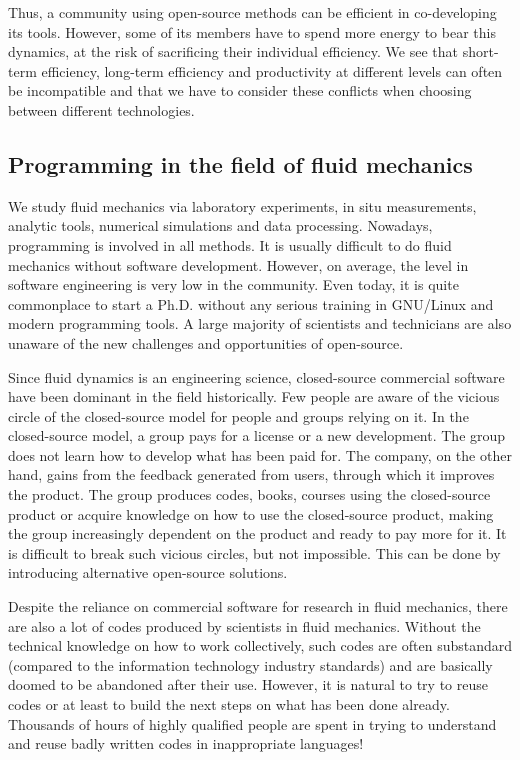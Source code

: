 Thus, a community using open-source methods can be efficient in co-developing
its tools. However, some of its members have to spend more energy to bear this
dynamics, at the risk of sacrificing their individual efficiency.  We see that
short-term efficiency, long-term efficiency and productivity at different
levels can often be incompatible and that we have to consider these conflicts
when choosing between different technologies.

\subsection{Programming in the field of fluid mechanics}

We study fluid mechanics via laboratory experiments, in situ measurements,
analytic tools, numerical simulations and data processing.
%
Nowadays, programming is involved in all methods. It is usually difficult to do
fluid mechanics without software development.
%
However, on average, the level in software engineering is very low in the
community.
%
Even today, it is quite commonplace to start a Ph.D. without any serious
training in GNU/Linux and modern programming tools.
%
A large majority of scientists and technicians are also unaware of the new
challenges and opportunities of open-source.

Since fluid dynamics is an engineering science, closed-source commercial
software have been dominant in the field historically.
%
Few people are aware of the vicious circle of the closed-source model for
people and groups relying on it.
%
In the closed-source model, a group pays for a license or a new development.
The group does not learn how to develop what has been paid for. The company, on
the other hand, gains from the feedback generated from users, through which it
improves the product.  The group produces codes, books, courses using the
closed-source product or acquire knowledge on how to use the closed-source
product, making the group increasingly dependent on the product and ready to
pay more for it.
%
It is difficult to break such vicious circles, but not impossible. This can be
done by introducing alternative open-source solutions.

Despite the reliance on commercial software for research in fluid mechanics,
there are also a lot of codes produced by scientists in fluid mechanics.
%
Without the technical knowledge on how to work collectively, such codes
are often substandard (compared to the information technology
industry standards) and are basically doomed to be abandoned after their use.
%
However, it is natural to try to reuse codes or at least to build the next steps
on what has been done already. Thousands of hours of highly qualified people
are spent in trying to understand and reuse badly written codes in
inappropriate languages!

